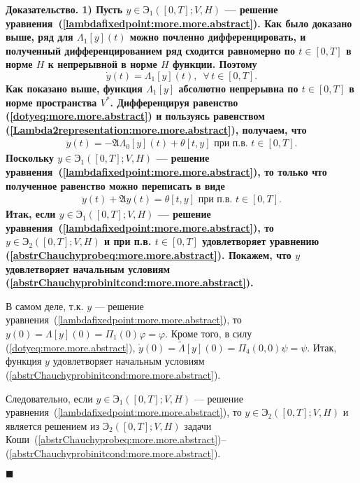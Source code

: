 \documentclass{report}
\newenvironment{Proof}{\par\noindent\bf Доказательство.\rm}{ $\blacksquare$\par}
\begin{document}
\begin{Proof}
1) Пусть $y\in{\textbf{Э}}_1([0,T];V,H)$ --- решение уравнения~(\ref{lambdafixedpoint:more.more.abstract}). Как было доказано выше, ряд для $\Lambda_1[y](t)$ можно почленно
дифференцировать, и полученный дифференцированием ряд сходится равномерно по $t\in[0,T]$ в норме $H$ к непрерывной в норме $H$ функции. Поэтому
\begin{equation}\label{dotyeq:more.more.abstract}
\dot y(t)=\Lambda_1[y](t),\,\,\,\forall\,t\in[0,T].
\end{equation}
Как показано выше, функция $\Lambda_1[y]$ абсолютно непрерывна по $t\in[0,T]$ в норме пространства $V^*$. Дифференцируя равенство (\ref{dotyeq:more.more.abstract}) и пользуясь равенством
(\ref{Lambda2representation:more.more.abstract}), получаем, что
\begin{gather*}
\ddot y(t)=-\mathfrak{A}\Lambda_0[y](t)+\theta[t,y]\mbox{ при п.в. $t\in[0,T]$.}
\end{gather*}
Поскольку $y\in{\textbf{Э}}_1([0,T];V,H)$ --- решение уравнения~(\ref{lambdafixedpoint:more.more.abstract}), то только что полученное равенство можно переписать в виде
\begin{gather*}
\ddot y(t)+\mathfrak{A}y(t)=\theta[t,y]\mbox{ при п.в. $t\in[0,T]$.}
\end{gather*}
Итак, если $y\in{\textbf{Э}}_1([0,T];V,H)$ --- решение уравнения~(\ref{lambdafixedpoint:more.more.abstract}), то $y\in{\textbf{Э}}_2([0,T];V,H)$ и при п.в. $t\in[0,T]$ удовлетворяет
уравнению (\ref{abstrChauchyprobeq:more.more.abstract}). Покажем, что $y$ удовлетворяет начальным условиям (\ref{abstrChauchyprobinitcond:more.more.abstract}).

В самом деле, т.к. $y$ --- решение уравнения~(\ref{lambdafixedpoint:more.more.abstract}), то $y(0)=\Lambda[y](0)=\Pi_1(0)\varphi=\varphi$. Кроме того, в силу
(\ref{dotyeq:more.more.abstract}), $\dot y(0)=\tilde\Lambda[y](0)=\Pi_4(0,0)\psi=\psi$. Итак, функция $y$ удовлетворяет начальным
условиям (\ref{abstrChauchyprobinitcond:more.more.abstract}).

Следовательно,  если $y\in{\textbf{Э}}_1([0,T];V,H)$ --- решение уравнения~(\ref{lambdafixedpoint:more.more.abstract}), то $y\in{\textbf{Э}}_2([0,T];V,H)$ и является решением из
${\textbf{Э}}_2([0,T];V,H)$ задачи Коши~(\ref{abstrChauchyprobeq:more.more.abstract})--(\ref{abstrChauchyprobinitcond:more.more.abstract}).


\end{Proof}
\end{document}
